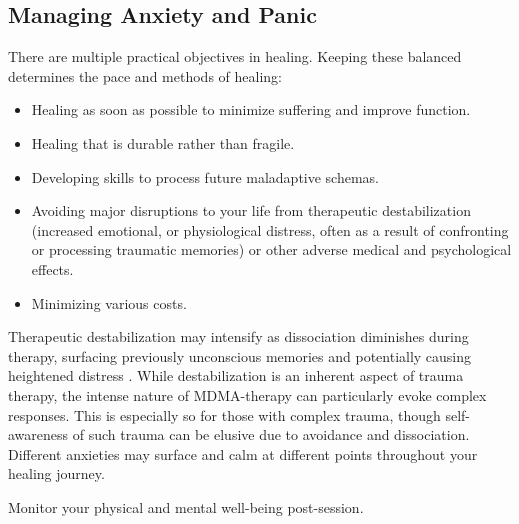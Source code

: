 \documentclass[12pt,letterpaper]{article}
\begin{document}
\subsection{Managing Anxiety and Panic}
\label{sectionManagement}
There are multiple practical objectives in healing. Keeping these balanced determines the pace and methods of healing: 
\begin{itemize}
    \item Healing as soon as possible to minimize suffering and improve function.
    \item Healing that is durable rather than fragile.
    \item Developing skills to process future maladaptive schemas.
    \item Avoiding major disruptions to your life from therapeutic destabilization (increased emotional, or physiological distress, often as a result of confronting or processing traumatic memories) or other adverse medical and psychological effects.
    \item Minimizing various costs.
\end{itemize}
Therapeutic destabilization may intensify as dissociation diminishes during therapy, surfacing previously unconscious memories and potentially causing heightened distress \cite{vanderKolkBody}. While destabilization is an inherent aspect of trauma therapy, the intense nature of MDMA-therapy can particularly evoke complex responses. This is especially so for those with complex trauma, though self-awareness of such trauma can be elusive due to avoidance and dissociation. Different anxieties may surface and calm at different points throughout your healing journey.

Monitor your physical and mental well-being post-session. 


\vspace{\baselineskip}
\end{document}
